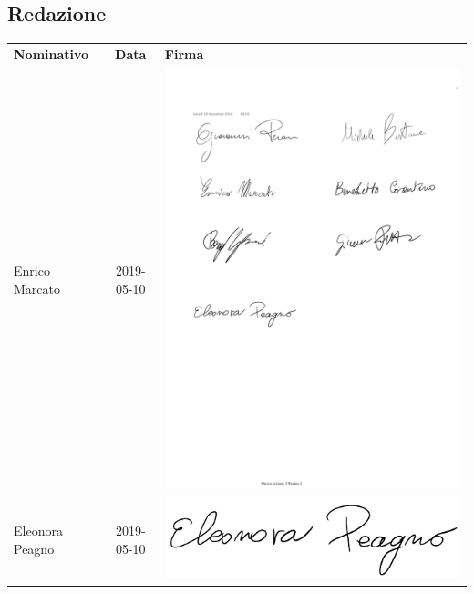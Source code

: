 \subsection{Redazione}

{\renewcommand{\arraystretch}{1.4}%
\begin{table}[H]
	\centering
	\begin{tabular}{| l | c | >{\centering\arraybackslash}m{8cm}
			|} 
		\rowcolor{LightBlue}
		\textbf{\color{white}Nominativo} & 
		\textbf{\color{white}Data} & 
		\textbf{\color{white}Firma} \\
	
	Enrico Marcato & 2019-05-10 & \includegraphics[scale=0.5]{images/firme/enrico.pdf}\\
	Eleonora Peagno & 2019-05-10 & \includegraphics[scale=0.5]{images/firme/ele.pdf}\\
	 \hline
\end{tabular}
\end{table}
}
